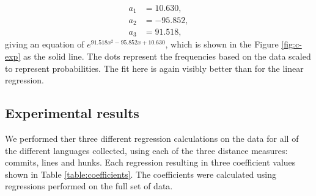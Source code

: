 \documentclass[10pt,journal,compsoc]{IEEEtran}
\begin{document}
\begin{align*}
a_1 & = 10.630, \\
a_2 & = -95.852, \\
a_3 & = 91.518,
\end{align*}
giving an equation of $e^{91.518 x^{2} - 95.852 x + 10.630}$, which is shown in the Figure \ref{fig:c-exp} as the solid line. The dots represent the frequencies based on the data scaled to represent probabilities. The fit here is again visibly better than for the linear regression.

\subsection{Experimental results}

We performed ther three different regression calculations on the data for all of the different languages collected, using each of the three distance measures: commits, lines and hunks. Each regression resulting in three coefficient values shown in Table \ref{table:coefficients}. The coefficients were calculated using regressions performed on the full set of data.
\end{document}
